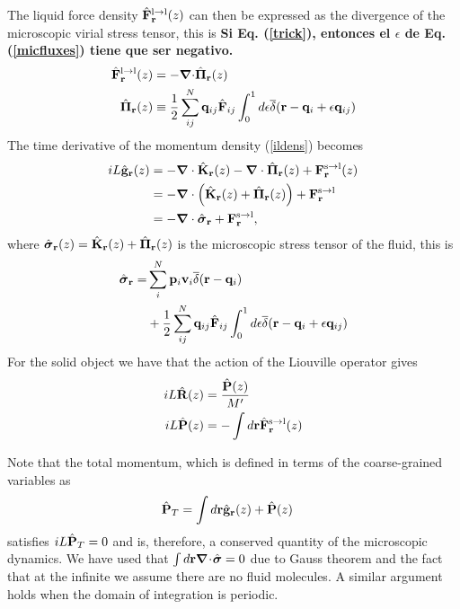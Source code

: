 \documentclass[b5paper,openright,11pt]{book}
\newcommand{\esc}{\!\cdot\!}
\newcommand{\Note}[1]{{\bf \color{red}#1}}    %
\begin{document}
The liquid  force density  $\hat{\bf F}^{\rm  l\to l}_{\bf  r}(z)$ can
then be expressed  as the divergence of the  microscopic virial stress
tensor, this is
\Note{Si Eq. (\ref{trick}), entonces el $\epsilon$ de Eq. (\ref{micfluxes}) tiene que ser negativo.}
\begin{align}
\hat{\bf F}^{\rm l\to l}_{\bf r}(z)&=-\boldsymbol{\nabla}{\cdot} \hat{\boldsymbol{\Pi}}_{\bf r}(z)
\nonumber\\
\hat{\boldsymbol{\Pi}}_{\bf r}(z)&\equiv \frac{1}{2}\sum^{N}_{ij}{\bf q}_{ij}\hat{\bf F}_{ij}
\int_0^{1}d\epsilon \overline\delta({\bf r}-{\bf q}_i+\epsilon{\bf q}_{ij})
\label{micfluxes}
\end{align}
The time derivative of the momentum density (\ref{ildens}) becomes
\begin{align}
    iL\hat{\bf g}_{\bf r}(z)
    &=-\boldsymbol{\nabla}\cdot \hat{{\bf K}}_{\bf r}(z) - \boldsymbol{\nabla}\cdot \hat{{\bf     \Pi}}_{\bf r}(z) +  {\bf F}^{\rm s\to l}_{\bf r}(z) \nonumber \\
    &= -\boldsymbol{\nabla}\cdot\left(\hat{{\bf K}}_{\bf r}(z)+\hat{{\bf \Pi}}_{\bf r}(z)\right) +{\bf F}^{\rm s\to l}_{\bf r} \nonumber \\
    &=-\boldsymbol{\nabla}\cdot \hat{\boldsymbol{\sigma}}_{\bf r}+{\bf F}^{\rm s\to l}_{\bf r},
\label{gls}
\end{align}
where     $\hat{\boldsymbol{\sigma}}_{\bf r}(z)=\hat{{\bf K}}_{\bf
r}(z)+\hat{\boldsymbol{\Pi}}_{\bf r}(z)$  is the microscopic stress
tensor of the fluid, this is
\begin{align}
  \hat{\boldsymbol{\sigma}}_{\bf r}=&
\sum^{N}_i{\bf p}_i{\bf v}_i
\overline\delta({\bf r}-{\bf q}_i)\nonumber\\
&+
\frac{1}{2}\sum^{N}_{ij}{\bf q}_{ij}\hat{\bf F}_{ij}
\int_0^{1}d\epsilon \overline\delta({\bf r}-{\bf q}_i+\epsilon{\bf q}_{ij})
\label{sigma}
\end{align}
For the solid object we have that the action of the Liouville operator gives
\begin{align}
    iL\hat{\bf R}(z) &=\frac{\hat{\bf P}(z)}{M'}
  \nonumber\\
    iL\hat{\bf P}(z) &=-\int  d{\bf r} \hat{\bf F}^{\rm s\to l}_{\bf r}(z)
   \label{Pfsl}  
\end{align} 

Note  that the  total  momentum,  which is  defined  in  terms of  the
coarse-grained variables as
\begin{align}
  \hat{\bf P}_T&=\int d{\bf r} \hat{\bf g}_{\bf r}(z)+\hat{\bf P}(z)
\end{align}
satisfies $ iL\hat{\bf P}_T=0$ and is, therefore, a conserved quantity
of  the  microscopic   dynamics.   We  have  used   that  $\int  d{\bf
r}\boldsymbol{\nabla}\esc\hat{\boldsymbol{\sigma}}=0$ due to  Gauss theorem  and the  fact
that at the infinite we assume there are no fluid molecules. A similar
argument holds when the domain of integration is periodic.
\end{document}
